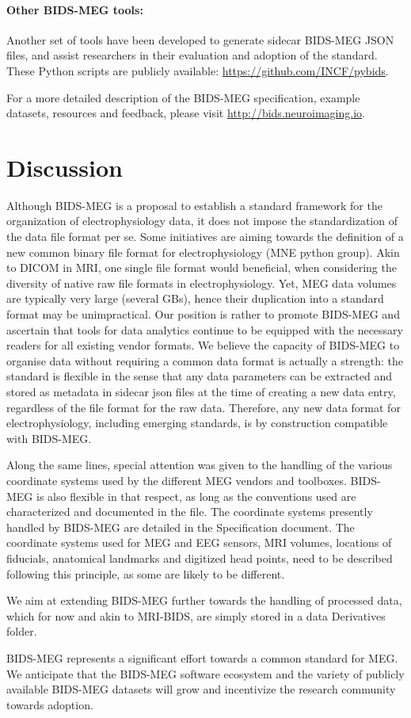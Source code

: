 \paragraph{Other BIDS-MEG tools:}

Another set of tools have been developed to generate sidecar BIDS-MEG JSON files, and assist researchers in their evaluation  and adoption of the standard. These Python scripts are publicly available:  \url{https://github.com/INCF/pybids}.

For a more detailed description of the BIDS-MEG specification, example datasets, resources and feedback, please visit \url{http://bids.neuroimaging.io}.

\section{Discussion}
\label{sec:bids_discussion}
Although BIDS-MEG is a proposal to establish a standard framework for the organization of electrophysiology data, it does not impose the standardization of the data file format per se. Some initiatives are aiming towards the definition of a new common binary file format for electrophysiology (MNE python group). Akin to DICOM in MRI, one single file format would beneficial, when considering the diversity of native raw file formats in electrophysiology. Yet, MEG data volumes are typically very large (several GBs), hence their duplication into a standard format may be unimpractical. Our position is rather to promote BIDS-MEG and ascertain that tools for data analytics continue to be equipped with the necessary readers for all existing vendor formats. We believe the capacity of BIDS-MEG to organise data without requiring a common data format is actually a strength: the standard is flexible in the sense that any data parameters can be extracted and stored as metadata in sidecar json files at the time of creating a new data entry, regardless of the file format for the raw data. Therefore, any new data format for electrophysiology, including emerging standards, is by construction compatible with BIDS-MEG.

Along the same lines, special attention was given to the handling of the various  coordinate systems used by the different MEG vendors and toolboxes. BIDS-MEG is also flexible in that respect, as long as the conventions used are characterized and documented in the  file. The coordinate systems presently handled by BIDS-MEG are detailed in the Specification document. The coordinate systems used for MEG and EEG sensors, MRI volumes, locations of fiducials, anatomical landmarks and digitized head points, need to be described following this principle, as some are likely to be different.

We aim at extending BIDS-MEG further towards the handling of processed data, which for now and akin to MRI-BIDS, are simply stored in a data Derivatives folder.

BIDS-MEG represents a significant effort towards a common standard for MEG. We anticipate that the BIDS-MEG software ecosystem and the variety of publicly available BIDS-MEG datasets will grow and incentivize the research community towards adoption. 
